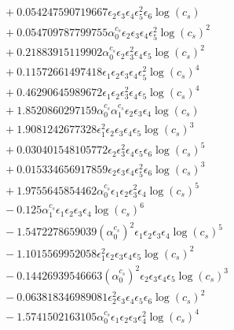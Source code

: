 \documentclass[10pt]{article}
\begin{document}
\begin{align*}
&{}  + 0.054247590719667 \epsilon_{2} \epsilon_{3} \epsilon_{4} \epsilon_{5}^{2} \epsilon_{6} \log{\left(c_{s} \right)} \\
&{}  + 0.054709787799755 \alpha_{0}^{c_s} \epsilon_{2} \epsilon_{3} \epsilon_{4} \epsilon_{5}^{2} \log{\left(c_{s} \right)}^{2} \\
&{}  + 0.21883915119902 \alpha_{0}^{c_s} \epsilon_{2} \epsilon_{3}^{2} \epsilon_{4} \epsilon_{5} \log{\left(c_{s} \right)}^{2} \\
&{}  + 0.11572661497418 \epsilon_{1} \epsilon_{2} \epsilon_{3} \epsilon_{4} \epsilon_{5}^{2} \log{\left(c_{s} \right)}^{4} \\
&{}  + 0.46290645989672 \epsilon_{1} \epsilon_{2} \epsilon_{3}^{2} \epsilon_{4} \epsilon_{5} \log{\left(c_{s} \right)}^{4} \\
&{}  + 1.8520860297159 \alpha_{0}^{c_s} \alpha_{1}^{c_s} \epsilon_{2} \epsilon_{3} \epsilon_{4} \log{\left(c_{s} \right)} \\
&{}  + 1.9081242677328 \epsilon_{1}^{2} \epsilon_{2} \epsilon_{3} \epsilon_{4} \epsilon_{5} \log{\left(c_{s} \right)}^{3} \\
&{}  + 0.030401548105772 \epsilon_{2} \epsilon_{3}^{2} \epsilon_{4} \epsilon_{5} \epsilon_{6} \log{\left(c_{s} \right)}^{5} \\
&{}  + 0.015334656917859 \epsilon_{2} \epsilon_{3} \epsilon_{4} \epsilon_{5}^{2} \epsilon_{6} \log{\left(c_{s} \right)}^{3} \\
&{}  + 1.9755645854462 \alpha_{0}^{c_s} \epsilon_{1} \epsilon_{2} \epsilon_{3}^{2} \epsilon_{4} \log{\left(c_{s} \right)}^{5} \\
&{}  - 0.125 \alpha_{1}^{c_s} \epsilon_{1} \epsilon_{2} \epsilon_{3} \epsilon_{4} \log{\left(c_{s} \right)}^{6} \\
&{}  - 1.5472278659039 \left(\alpha_{0}^{c_s}\right)^{2} \epsilon_{1} \epsilon_{2} \epsilon_{3} \epsilon_{4} \log{\left(c_{s} \right)}^{5} \\
&{}  - 1.1015569952058 \epsilon_{1}^{2} \epsilon_{2} \epsilon_{3} \epsilon_{4} \epsilon_{5} \log{\left(c_{s} \right)}^{2} \\
&{}  - 0.14426939546663 \left(\alpha_{0}^{c_s}\right)^{2} \epsilon_{2} \epsilon_{3} \epsilon_{4} \epsilon_{5} \log{\left(c_{s} \right)}^{3} \\
&{}  - 0.063818346989081 \epsilon_{2}^{2} \epsilon_{3} \epsilon_{4} \epsilon_{5} \epsilon_{6} \log{\left(c_{s} \right)}^{2} \\
&{}  - 1.5741502163105 \alpha_{0}^{c_s} \epsilon_{1} \epsilon_{2} \epsilon_{3} \epsilon_{4}^{2} \log{\left(c_{s} \right)}^{4} \\

\end{align*}
\end{document}
